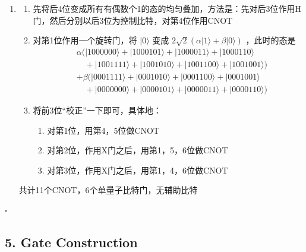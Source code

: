 \documentclass{ctexart}
\newcommand{\ket}[1]{|#1\rangle}
\begin{document}
\begin{enumerate}
    \item[(d)] \begin{enumerate}
        \item[(1)] 先将后4位变成所有有偶数个1的态的均匀叠加，方法是：先对后3位作用H门，然后分别以后3位为控制比特，对第4位作用CNOT
        \item[(2)] 对第1位作用一个旋转门，将 $\ket{0}$ 变成 $2\sqrt{2}(\alpha\ket{1} + \beta\ket{0})$ ，此时的态是
        \begin{align*}
            &\alpha(\ket{1000000}+\ket{1000101}+\ket{1000011}+\ket{1000110} \\
            &\quad +\ket{1001111}+\ket{1001010}+\ket{1001100}+\ket{1001001}) \\
            &+\beta(\ket{0001111}+\ket{0001010}+\ket{0001100}+\ket{0001001} \\
            &\quad +\ket{0000000}+\ket{0000101}+\ket{0000011}+\ket{0000110})
        \end{align*}
        \item[(3)] 将前3位“校正”一下即可，具体地：\begin{enumerate}
            \item[]对第1位，用第4，5位做CNOT
            \item[]对第2位，作用X门之后，用第1，5，6位做CNOT
            \item[]对第3位，作用X门之后，用第1，4，6位做CNOT
        \end{enumerate}
    \end{enumerate}
    共计11个CNOT，6个单量子比特门，无辅助比特
\end{enumerate}

\hfill $\square$

\subsection*{5. Gate Construction}
\end{document}
